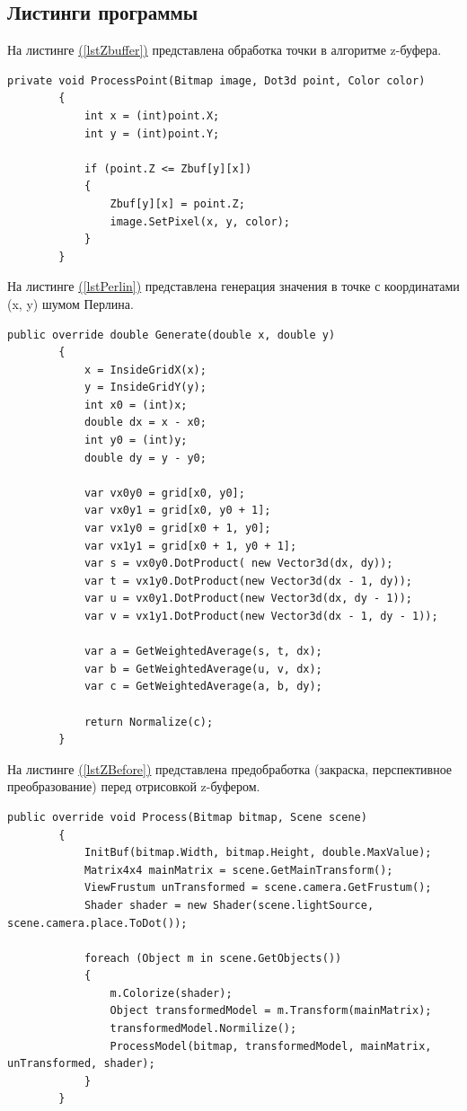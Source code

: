 \documentclass{article}
\begin{document}
	\subsection{Листинги программы}
	На листинге \hyperref[lstZbuffer]{(\ref{lstZbuffer})} представлена обработка точки в алгоритме z-буфера.
	\begin{lstlisting}[label=lstZbuffer,caption=Z-buffer]
	private void ProcessPoint(Bitmap image, Dot3d point, Color color)
        {
            int x = (int)point.X;
            int y = (int)point.Y;

            if (point.Z <= Zbuf[y][x])
            {
                Zbuf[y][x] = point.Z;
                image.SetPixel(x, y, color);
            }
        }
	\end{lstlisting}
	На листинге \hyperref[lstPerlin]{(\ref{lstPerlin})} представлена генерация значения в точке с координатами (x, y) шумом Перлина.
	\begin{lstlisting}[label=lstPerlin,caption=Генерация шумом Перлина]
        public override double Generate(double x, double y)
        {
            x = InsideGridX(x);
            y = InsideGridY(y);
            int x0 = (int)x;
            double dx = x - x0;
            int y0 = (int)y;
            double dy = y - y0;

            var vx0y0 = grid[x0, y0];
            var vx0y1 = grid[x0, y0 + 1];
            var vx1y0 = grid[x0 + 1, y0];
            var vx1y1 = grid[x0 + 1, y0 + 1];
            var s = vx0y0.DotProduct( new Vector3d(dx, dy));
            var t = vx1y0.DotProduct(new Vector3d(dx - 1, dy));
            var u = vx0y1.DotProduct(new Vector3d(dx, dy - 1));
            var v = vx1y1.DotProduct(new Vector3d(dx - 1, dy - 1));

            var a = GetWeightedAverage(s, t, dx);
            var b = GetWeightedAverage(u, v, dx);
            var c = GetWeightedAverage(a, b, dy);

            return Normalize(c);
        }
	\end{lstlisting}

На листинге \hyperref[lstZBefore]{(\ref{lstZBefore})} представлена предобработка (закраска, перспективное преобразование) перед отрисовкой z-буфером.
	\begin{lstlisting}[label=lstZBefore,caption=Верхний уровень обработки Z-буфером]
	public override void Process(Bitmap bitmap, Scene scene)
        {
            InitBuf(bitmap.Width, bitmap.Height, double.MaxValue);
            Matrix4x4 mainMatrix = scene.GetMainTransform();
            ViewFrustum unTransformed = scene.camera.GetFrustum();
            Shader shader = new Shader(scene.lightSource, scene.camera.place.ToDot());

            foreach (Object m in scene.GetObjects())
            {
                m.Colorize(shader);
                Object transformedModel = m.Transform(mainMatrix);
                transformedModel.Normilize();
                ProcessModel(bitmap, transformedModel, mainMatrix, unTransformed, shader);
            }
        }
	\end{lstlisting}
\end{document}
